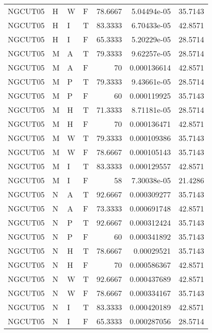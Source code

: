 \begin{table}[!htb]
{\begin{tabular}{llllrrr}
            NGCUT05  & H     & W     & F          & 78.6667    & 5.04494e-05 & 35.7143  \\
            NGCUT05  & H     & I     & T          & 83.3333    & 6.70433e-05 & 42.8571  \\
            NGCUT05  & H     & I     & F          & 65.3333    & 5.20229e-05 & 28.5714  \\
            NGCUT05  & M     & A     & T          & 79.3333    & 9.62257e-05 & 28.5714  \\
            NGCUT05  & M     & A     & F          & 70         & 0.000136614 & 42.8571  \\
            NGCUT05  & M     & P     & T          & 79.3333    & 9.43661e-05 & 28.5714  \\
            NGCUT05  & M     & P     & F          & 60         & 0.000119925 & 35.7143  \\
            NGCUT05  & M     & H     & T          & 71.3333    & 8.71181e-05 & 28.5714  \\
            NGCUT05  & M     & H     & F          & 70         & 0.000136471 & 42.8571  \\
            NGCUT05  & M     & W     & T          & 79.3333    & 0.000109386 & 35.7143  \\
            NGCUT05  & M     & W     & F          & 78.6667    & 0.000105143 & 35.7143  \\
            NGCUT05  & M     & I     & T          & 83.3333    & 0.000129557 & 42.8571  \\
            NGCUT05  & M     & I     & F          & 58         & 7.30038e-05 & 21.4286  \\
            NGCUT05  & N     & A     & T          & 92.6667    & 0.000309277 & 35.7143  \\
            NGCUT05  & N     & A     & F          & 73.3333    & 0.000691748 & 42.8571  \\
            NGCUT05  & N     & P     & T          & 92.6667    & 0.000312424 & 35.7143  \\
            NGCUT05  & N     & P     & F          & 60         & 0.000341892 & 35.7143  \\
            NGCUT05  & N     & H     & T          & 78.6667    & 0.00029521  & 35.7143  \\
            NGCUT05  & N     & H     & F          & 70         & 0.000586367 & 42.8571  \\
            NGCUT05  & N     & W     & T          & 92.6667    & 0.000437689 & 42.8571  \\
            NGCUT05  & N     & W     & F          & 78.6667    & 0.000334167 & 35.7143  \\
            NGCUT05  & N     & I     & T          & 83.3333    & 0.000420189 & 42.8571  \\
            NGCUT05  & N     & I     & F          & 65.3333    & 0.000287056 & 28.5714  \\
            \hline
        \end{tabular}
    }{}
\end{table}